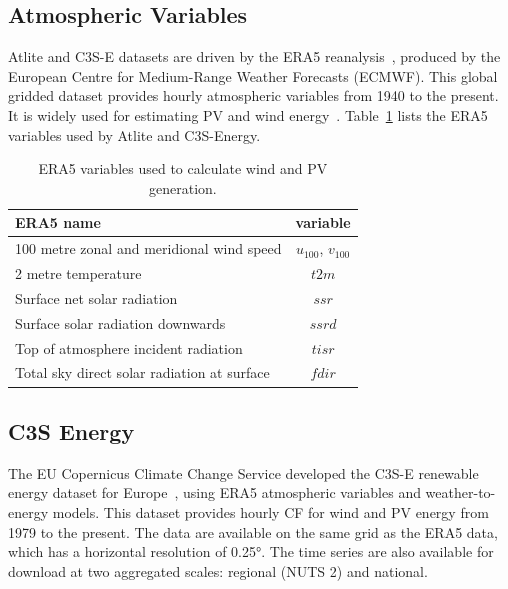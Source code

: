\documentclass[a4paper, 11pt]{article}
\begin{document}
\subsection{Atmospheric Variables}
\label{sec:era5}
 
Atlite and C3S-E datasets are driven by the ERA5 reanalysis~\cite{hersbach2020era5}, produced by the European Centre for Medium-Range Weather Forecasts (ECMWF). This global gridded dataset provides hourly atmospheric variables from 1940 to the present. It is widely used for estimating PV and wind energy~\cite{mockert2023drought, dubus2023energy, brown2021drought, otero2022drought}. Table~\ref{tab:var_name} lists the ERA5 variables used by Atlite and C3S-Energy.

\begin{table}[h!]
	\centering
	\begin{tabular}{|l|c|}
		\hline
		{\textbf{ERA5 name}}      & \textbf{variable} \\ \hline
		100 metre zonal and meridional wind speed   & $u_{100}$, $v_{100}$ \\
		2 metre temperature                         & $t2m$ \\
		Surface net solar radiation                 & $ssr$ \\
		Surface solar radiation downwards           & $ssrd$  \\
		Top of atmosphere incident radiation        & $tisr$  \\
		Total sky direct solar radiation at surface & $fdir$  \\ \hline
	\end{tabular}
	\caption{ERA5 variables used to calculate wind and PV generation.}
	\label{tab:var_name}
\end{table}

\subsection{C3S Energy}
\label{sec:c3se}

The EU Copernicus Climate Change Service developed the C3S-E renewable energy dataset for Europe~\cite{dubus2023energy}, using ERA5 atmospheric variables and weather-to-energy models. This dataset provides hourly CF for wind and PV energy from 1979 to the present. The data are available on the same grid as the ERA5 data, which has a horizontal resolution of 0.25°. The time series are also available for download at two aggregated scales: regional (NUTS 2) and national.
\end{document}
